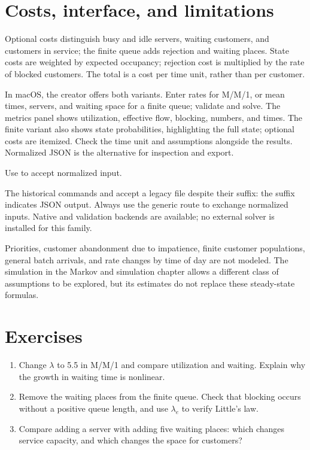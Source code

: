 \section{Costs, interface, and limitations}
Optional costs distinguish busy and idle servers, waiting customers, and
customers in service; the finite queue adds rejection and waiting places.
State costs are weighted by expected occupancy; rejection cost is multiplied
by the rate of blocked customers. The total is a cost per time unit, rather
than per customer.

In macOS, the creator offers both variants. Enter rates for M/M/1, or mean
times, servers, and waiting space for a finite queue; validate and solve. The
metrics panel shows utilization, effective flow, blocking, numbers, and times.
The finite variant also shows state probabilities, highlighting the full state;
optional costs are itemized. Check the time unit and assumptions alongside the
results. Normalized JSON is the alternative for inspection and export.

Use  to accept normalized input.

The historical commands  and
 accept a legacy file despite their suffix:
the suffix indicates JSON output. Always use the generic route to exchange
normalized inputs. Native and validation backends are available; no external
solver is installed for this family.

Priorities, customer abandonment due to impatience, finite customer populations,
general batch arrivals, and rate changes by time of day are not modeled.
The simulation in the Markov and simulation chapter allows a different class
of assumptions to be explored, but its estimates do not replace these
steady-state formulas.

\section{Exercises}
\begin{enumerate}
\item Change \(\lambda\) to 5.5 in M/M/1 and compare utilization and waiting.
Explain why the growth in waiting time is nonlinear.
\item Remove the waiting places from the finite queue. Check that blocking
occurs without a positive queue length, and use \(\lambda_e\) to verify
Little's law.
\item Compare adding a server with adding five waiting places: which changes
service capacity, and which changes the space for customers?
\end{enumerate}
